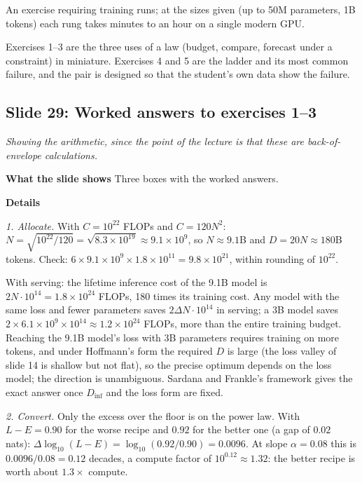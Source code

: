 \documentclass[11pt,letterpaper]{article}
\newcommand{\slide}[3]{%
  \subsection[Slide #1: #2]{Slide #1: #2}%
  {\color{muted}\itshape #3\par}\medskip}
\newcommand{\para}[1]{\medskip\noindent\textbf{#1}\quad}
\newenvironment{terms}{\begin{tcolorbox}[termsbox]\begin{description}[leftmargin=1.1em,itemsep=3pt,topsep=2pt,font=\normalfont]}{\end{description}\end{tcolorbox}}
\newcommand{\term}[2]{\item[\textbf{#1}]\index{#1} #2}
\newenvironment{intuition}{\begin{tcolorbox}[intuitionbox]}{\end{tcolorbox}}
\begin{document}
\begin{terms}
\term{GPU exercise}{An exercise requiring training runs; at the sizes given (up to 50M parameters, 1B tokens) each rung takes minutes to an hour on a single modern GPU.}
\end{terms}

\begin{intuition}
Exercises 1--3 are the three uses of a law (budget, compare, forecast under a constraint) in miniature. Exercises 4 and 5 are the ladder and its most common failure, and the pair is designed so that the student's own data show the failure.
\end{intuition}

\slide{29}{Worked answers to exercises 1--3}{Showing the arithmetic, since the point of the lecture is that these are back-of-envelope calculations.}

\para{What the slide shows} Three boxes with the worked answers.

\para{Details}

\emph{1. Allocate.} With $C=10^{22}$ FLOPs and $C=120N^2$: $N=\sqrt{10^{22}/120}=\sqrt{8.3\times10^{19}}\approx9.1\times10^{9}$, so $N\approx9.1$B and $D=20N\approx180$B tokens. Check: $6\times9.1\times10^9\times1.8\times10^{11}=9.8\times10^{21}$, within rounding of $10^{22}$.

With serving: the lifetime inference cost of the 9.1B model is $2N\cdot10^{14}=1.8\times10^{24}$ FLOPs, 180 times its training cost. Any model with the same loss and fewer parameters saves $2\Delta N\cdot10^{14}$ in serving; a 3B model saves $2\times6.1\times10^9\times10^{14}\approx1.2\times10^{24}$ FLOPs, more than the entire training budget. Reaching the 9.1B model's loss with 3B parameters requires training on more tokens, and under Hoffmann's form the required $D$ is large (the loss valley of slide 14 is shallow but not flat), so the precise optimum depends on the loss model; the direction is unambiguous. Sardana and Frankle's framework gives the exact answer once $D_{\text{inf}}$ and the loss form are fixed.

\emph{2. Convert.} Only the excess over the floor is on the power law. With $L-E=0.90$ for the worse recipe and $0.92$ for the better one (a gap of $0.02$ nats): $\Delta\log_{10}(L-E)=\log_{10}(0.92/0.90)=0.0096$. At slope $\alpha=0.08$ this is $0.0096/0.08=0.12$ decades, a compute factor of $10^{0.12}\approx1.32$: the better recipe is worth about $1.3\times$ compute.
\end{document}
